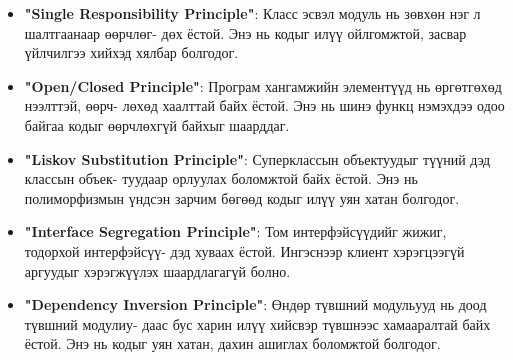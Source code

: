\begin{itemize}
	\item \textbf{"Single Responsibility Principle"}: Класс эсвэл модуль нь зөвхөн нэг л шалтгаанаар өөрчлөг- дөх ёстой. Энэ нь кодыг илүү ойлгомжтой, засвар үйлчилгээ хийхэд хялбар болгодог.
	\item \textbf{"Open/Closed Principle"}: Програм хангамжийн элементүүд нь өргөтгөхөд нээлттэй, өөрч- лөхөд хаалттай байх ёстой. Энэ нь шинэ функц нэмэхдээ одоо байгаа кодыг өөрчлөхгүй байхыг шаарддаг.
	\item \textbf{"Liskov Substitution Principle"}: Суперклассын объектуудыг түүний дэд классын объек- туудаар орлуулах боломжтой байх ёстой. Энэ нь полиморфизмын үндсэн зарчим бөгөөд кодыг илүү уян хатан болгодог.
	\item \textbf{"Interface Segregation Principle"}: Том интерфэйсүүдийг жижиг, тодорхой интерфэйсүү- дэд хуваах ёстой. Ингэснээр клиент хэрэгцээгүй аргуудыг хэрэгжүүлэх шаардлагагүй болно.
	\item \textbf{"Dependency Inversion Principle"}: Өндөр түвшний модульууд нь доод түвшний модулиу- даас бус харин илүү хийсвэр түвшнээс хамааралтай байх ёстой. Энэ нь кодыг уян хатан, дахин ашиглах боломжтой болгодог.
\end{itemize}
